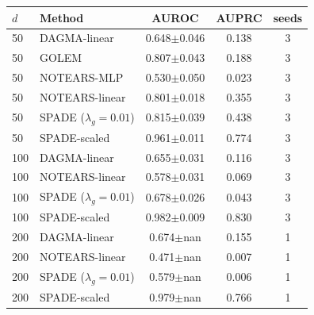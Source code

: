 \begin{tabular}{llccc}
\toprule
$d$ & Method & AUROC & AUPRC & seeds \\ \midrule
50 & DAGMA-linear & 0.648$\pm$0.046 & 0.138 & 3 \\
50 & GOLEM & 0.807$\pm$0.043 & 0.188 & 3 \\
50 & NOTEARS-MLP & 0.530$\pm$0.050 & 0.023 & 3 \\
50 & NOTEARS-linear & 0.801$\pm$0.018 & 0.355 & 3 \\
50 & SPADE ($\lambda_g{=}0.01$) & 0.815$\pm$0.039 & 0.438 & 3 \\
50 & SPADE-scaled & 0.961$\pm$0.011 & 0.774 & 3 \\
100 & DAGMA-linear & 0.655$\pm$0.031 & 0.116 & 3 \\
100 & NOTEARS-linear & 0.578$\pm$0.031 & 0.069 & 3 \\
100 & SPADE ($\lambda_g{=}0.01$) & 0.678$\pm$0.026 & 0.043 & 3 \\
100 & SPADE-scaled & 0.982$\pm$0.009 & 0.830 & 3 \\
200 & DAGMA-linear & 0.674$\pm$nan & 0.155 & 1 \\
200 & NOTEARS-linear & 0.471$\pm$nan & 0.007 & 1 \\
200 & SPADE ($\lambda_g{=}0.01$) & 0.579$\pm$nan & 0.006 & 1 \\
200 & SPADE-scaled & 0.979$\pm$nan & 0.766 & 1 \\
\bottomrule
\end{tabular}
